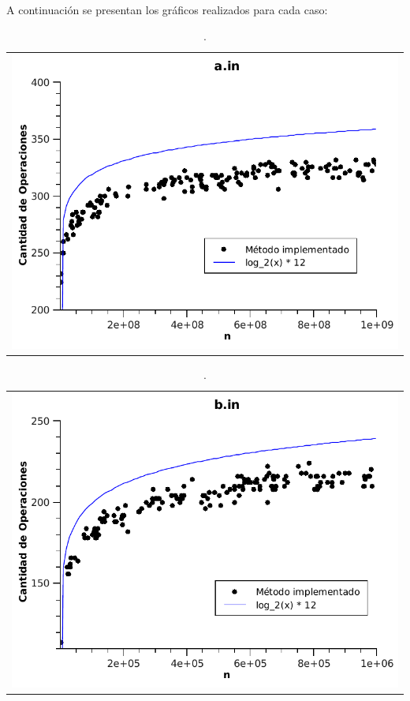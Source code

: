 \paragraph{}
A continuación se presentan los gráficos realizados para cada caso:

	\begin{table}[ht]
		\centering 
			\begin{tabular}{c}
				\includegraphics[scale = 0.8]{./../ej1/tests/a.pdf}
			\end{tabular}
			\caption{.}
			\label{grafico1} 
	\end{table}

	\begin{table}[ht]
		\centering 
			\begin{tabular}{c}
				\includegraphics[scale = 0.8]{./../ej1/tests/b.pdf}
			\end{tabular}
			\caption{.} 
			\label{grafico2} 
	\end{table}

